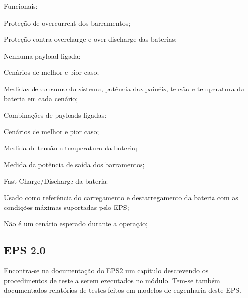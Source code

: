 \begin{alineas}
    \item Funcionais:
    \begin{alineas}
        \item Proteção de overcurrent dos barramentos;
        \item Proteção contra overcharge e over discharge das baterias;
    \end{alineas}
    \item Nenhuma payload ligada:
    \begin{alineas}
        \item Cenários de melhor e pior caso;
        \item Medidas de consumo do sistema, potência dos painéis, tensão e temperatura da bateria em cada cenário;
    \end{alineas}
    \item Combinações de payloads ligadas:
    \begin{alineas}
        \item Cenários de melhor e pior caso;
        \item Medida de tensão e temperatura da bateria;
        \item Medida da potência de saída dos barramentos;
    \end{alineas}
    \item Fast Charge/Discharge da bateria:
    \begin{alineas}
        \item Usado como referência do carregamento e descarregamento da bateria com as condições máximas suportadas pelo EPS;
        \item Não é um cenário esperado durante a operação;
    \end{alineas}
\end{alineas}



\subsection{EPS 2.0}

Encontra-se na documentação do \gls{EPS2} \cite{eps2-doc} um capítulo descrevendo os procedimentos de teste a serem executados no módulo.
Tem-se também documentados relatórios de testes feitos em modelos de engenharia deste \gls{EPS}.

